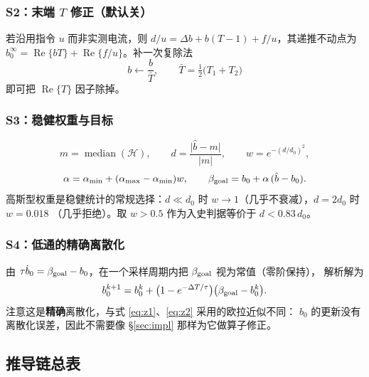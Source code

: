 \documentclass[11pt,a4paper]{ctexart}
\begin{document}
\subsubsection*{S2：末端 $T$ 修正（默认关）}

若沿用指令 $u$ 而非实测电流，则 $d/u=\Delta b+b(T-1)+f/u$，其递推不动点为
$b_0^{\infty}=\operatorname{Re}\{bT\}+\operatorname{Re}\{f/u\}$。补一次复除法
\begin{equation}
b\leftarrow\frac{b}{\bar T},\qquad \bar T=\tfrac12\big(T_1+T_2\big)
\label{eq:E9}
\end{equation}
即可把 $\operatorname{Re}\{T\}$ 因子除掉。

\subsubsection*{S3：稳健权重与目标}

\begin{equation}
m=\operatorname{median}(\mathcal H),\qquad
d=\frac{\lvert\hat b-m\rvert}{\lvert m\rvert},\qquad
w=e^{-(d/d_0)^2},
\label{eq:E10}
\end{equation}
\begin{equation}
\alpha=\alpha_{\min}+(\alpha_{\max}-\alpha_{\min})w,
\qquad
\beta_{\rm goal}=b_0+\alpha\,(\hat b-b_0).
\label{eq:E11}
\end{equation}
高斯型权重是稳健统计的常规选择：$d\ll d_0$ 时 $w\to1$（几乎不衰减），$d=2d_0$ 时 $w=0.018$
（几乎拒绝）。取 $w>0.5$ 作为入史判据等价于 $d<0.83\,d_0$。

\subsubsection*{S4：低通的精确离散化}

由 $\tau\dot b_0=\beta_{\rm goal}-b_0$，在一个采样周期内把 $\beta_{\rm goal}$ 视为常值（零阶保持），
解析解为
\begin{equation}
b_0^{k+1}=b_0^k+\big(1-e^{-\Delta T/\tau}\big)\big(\beta_{\rm goal}-b_0^k\big).
\label{eq:E12}
\end{equation}
注意这是\textbf{精确}离散化，与式 \eqref{eq:z1}、\eqref{eq:z2} 采用的欧拉近似不同：
$b_0$ 的更新没有离散化误差，因此不需要像 §\ref{sec:impl} 那样为它做算子修正。

\subsection{推导链总表}
\end{document}
